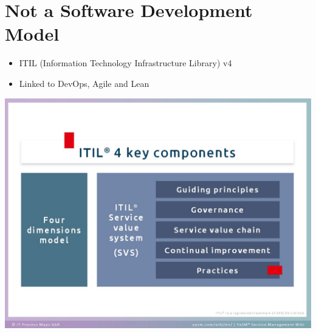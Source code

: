 \documentclass{article}[18pt]
\begin{document}
\section{Not a Software Development Model}
\begin{itemize}
	\item ITIL (Information Technology Infrastructure Library) v4
	\item Linked to DevOps, Agile and Lean
\end{itemize}
\begin{center}
	\includegraphics[scale=0.7]{ITIL}
\end{center}
\end{document}
